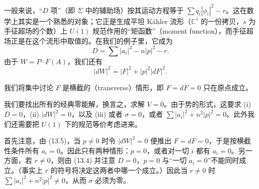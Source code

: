 
一般来说，“$D$ 项”（即 $\Sigma$ 中的辅助场）按其运动方程等于 $\sum q_i|\phi_i|^{2}-r$。这在数学上其实是一个熟悉的对象；它正是生成平坦 Kähler 流形（$\mathbb{C}^{s}$ 的一份拷贝，$s$ 为手征超场的个数）上 $U(1)$ 规范作用的“矩函数”（moment function），而手征超场正是在这个流形中取值的。在我们的例子里，它成为
\begin{equation}
  \tag{13.4}
  \label{eq:13-4}
  D=\sum|a_i|^{2}-n|p|^{2}-r.
\end{equation}
由于 $W=P\cdot F(A)$，我们还有
\begin{equation}
  \tag{13.5}
  \label{eq:13-5}
  |dW|^{2}=|F|^{2}+|p|^{2}|dF|^{2}.
\end{equation}

我们将集中讨论 $F$ 是横截的（transverse）情形，即 $F=dF=0$ 只在原点成立。

我们要找出所有的经典零能解，换言之，求解 $V=0$。由于势的形式，这要求 (i) $D=0$，(ii) $|dW|^{2}=0$，以及 (iii) 或者 $\sigma=0$，或者 $\sum|a_i|^{2}+n^{2}|p|^{2}=0$。此外我们还需要把 $U(1)$ 下的规范等价考虑进来。

首先注意，由 (13.5)，当 $p\ne0$ 时令 $|dW|^{2}=0$ 便推出 $F=dF=0$，于是按横截性条件所有 $a_i=0$。因此只有两种情形：$p=0$，或者对一切 $i$ 都有 $a_i=0$。另一方面，若 $r\ne0$，则由 (13.4) 并注意 $D=0$，$p=0$ 与“一切 $a_i=0$”不能同时成立。（事实上 $r$ 的符号将决定这两者中哪一个成立。）因此当 $r\ne0$ 时 $\sum|a_i|^{2}+n^{2}|p|^{2}\ne0$，从而 $\sigma$ 必须为零。


